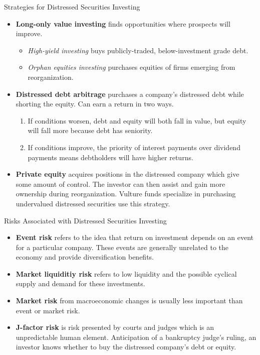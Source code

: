 \documentclass[../custom]{flashcards}
\begin{document}
\begin{flashcard}{Strategies for Distressed Securities Investing}
    \begin{itemize}
        \item \textbf{Long-only value investing} finds opportunities where prospects will improve.
            \begin{itemize}
                \item \textit{High-yield investing} buys publicly-traded, below-investment grade debt.
                \item \textit{Orphan equities investing} purchases equities of firms emerging from reorganization.
            \end{itemize}
        \item \textbf{Distressed debt arbitrage} purchases a company's distressed debt while shorting the equity. Can earn a return in two ways.
            \begin{enumerate}
                \item If conditions worsen, debt and equity will both fall in value, but equity will fall more because debt has seniority.
                \item If conditions improve, the priority of interest payments over dividend payments means debtholders will have higher returns.
            \end{enumerate}
        \item \textbf{Private equity} acquires positions in the distressed company which give some amount of control. The investor can then assist and gain more ownership during reorganization. Vulture funds specialize in purchasing undervalued distressed securities use this strategy.
    \end{itemize}
\end{flashcard}

\begin{flashcard}{Risks Associated with Distressed Securities Investing}
    \begin{itemize}
        \item \textbf{Event risk} refers to the idea that return on investment depends on an event for a particular company. These events are generally unrelated to the economy and provide diversification benefits.
        \item \textbf{Market liquiditiy risk} refers to low liquidity and the possible cyclical supply and demand for these investments.
        \item \textbf{Market risk} from macroeconomic changes is usually less important than event or market risk.
        \item \textbf{J-factor risk} is risk presented by courts and judges which is an unpredictable human element. Anticipation of a bankruptcy judge's ruling, an investor knows whether to buy the distressed company's debt or equity.
    \end{itemize}
\end{flashcard}
\end{document}
